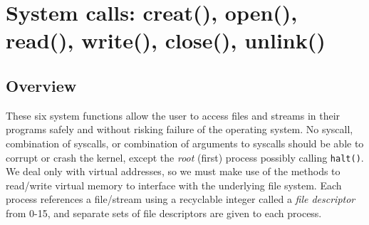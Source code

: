 \section{System calls: creat(), open(), read(), write(), close(), unlink()}
\subsection{Overview}
These six system functions allow the user to access files and streams in their programs safely and without risking failure of the operating system. No syscall, combination of syscalls, or combination of arguments to syscalls should be able to corrupt or crash the kernel, except the \textit{root} (first) process possibly calling \texttt{halt()}. We deal only with virtual addresses, so we must make use of the methods to read/write virtual memory to interface with the underlying file system. Each process references a file/stream using a recyclable integer called a \textit{file descriptor} from 0-15, and separate sets of file descriptors are given to each process.
